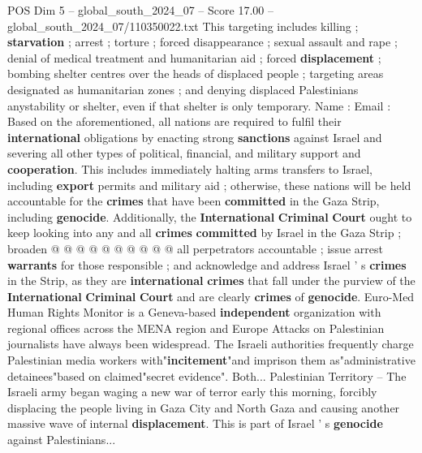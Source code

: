 \begin{textsample}{POS Dim 5 – global\_south\_2024\_07 – Score 17.00 – global\_south\_2024\_07/110350022.txt}
This targeting includes killing ; \textbf{starvation} ; arrest ; torture ; forced disappearance ; sexual assault and rape ; denial of medical treatment and humanitarian aid ; forced \textbf{displacement} ; bombing shelter centres over the heads of displaced people ; targeting areas designated as humanitarian zones ; and denying displaced Palestinians anystability or shelter, even if that shelter is only temporary.
Name : Email : Based on the aforementioned, all nations are required to fulfil their \textbf{international} obligations by enacting strong \textbf{sanctions} against Israel and severing all other types of political, financial, and military support and \textbf{cooperation}.
This includes immediately halting arms transfers to Israel, including \textbf{export} permits and military aid ; otherwise, these nations will be held accountable for the \textbf{crimes} that have been \textbf{committed} in the Gaza Strip, including \textbf{genocide}.
Additionally, the \textbf{International} \textbf{Criminal} \textbf{Court} ought to keep looking into any and all \textbf{crimes} \textbf{committed} by Israel in the Gaza Strip ; broaden @ @ @ @ @ @ @ @ @ @ all perpetrators accountable ; issue arrest \textbf{warrants} for those responsible ; and acknowledge and address Israel ' s \textbf{crimes} in the Strip, as they are \textbf{international} \textbf{crimes} that fall under the purview of the \textbf{International} \textbf{Criminal} \textbf{Court} and are clearly \textbf{crimes} of \textbf{genocide}.
Euro-Med Human Rights Monitor is a Geneva-based \textbf{independent} organization with regional offices across the MENA region and Europe Attacks on Palestinian journalists have always been widespread.
The Israeli authorities frequently charge Palestinian media workers with"\textbf{incitement}"and imprison them as"administrative detainees"based on claimed"secret evidence".
Both...
Palestinian Territory -- The Israeli army began waging a new war of terror early this morning, forcibly displacing the people living in Gaza City and North Gaza and causing another massive wave of internal \textbf{displacement}.
This is part of Israel ' s \textbf{genocide} against Palestinians...

\end{textsample}
